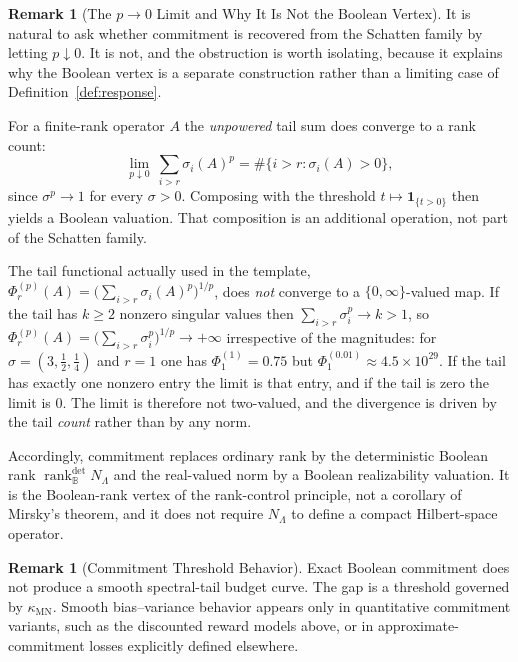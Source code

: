 \documentclass[12pt]{article}
\theoremstyle{definition}
\newtheorem{remark}[theorem]{Remark}
\newcommand{\rankBdet}{\operatorname{rank}_{\mathbb B}^{\mathrm{det}}}
\newcommand{\kappaMN}{\kappa_{\mathrm{MN}}}
\begin{document}
\begin{remark}[The $p\to0$ Limit and Why It Is Not the Boolean Vertex]
\label{rem:p-to-zero}
It is natural to ask whether commitment is recovered from the Schatten family
by letting $p\downarrow0$.  It is not, and the obstruction is worth isolating,
because it explains why the Boolean vertex is a separate construction rather
than a limiting case of Definition~\ref{def:response}.

For a finite-rank operator $A$ the \emph{unpowered} tail sum does converge to a
rank count:
\[
\lim_{p\downarrow0}\ \sum_{i>r}\sigma_i(A)^p
=
\#\{i>r:\sigma_i(A)>0\},
\]
since $\sigma^p\to1$ for every $\sigma>0$.  Composing with the threshold
$t\mapsto\mathbf 1_{\{t>0\}}$ then yields a Boolean valuation.  That
composition is an additional operation, not part of the Schatten family.

The tail functional actually used in the template,
$\Phi^{(p)}_r(A)=\bigl(\sum_{i>r}\sigma_i(A)^p\bigr)^{1/p}$, does \emph{not}
converge to a $\{0,\infty\}$-valued map.  If the tail has $k\ge2$ nonzero
singular values then $\sum_{i>r}\sigma_i^p\to k>1$, so
$\Phi^{(p)}_r(A)=\bigl(\sum_{i>r}\sigma_i^p\bigr)^{1/p}\to+\infty$ irrespective
of the magnitudes: for $\sigma=(3,\tfrac12,\tfrac14)$ and $r=1$ one has
$\Phi^{(1)}_1=0.75$ but $\Phi^{(0.01)}_1\approx4.5\times10^{29}$.  If the tail
has exactly one nonzero entry the limit is that entry, and if the tail is zero
the limit is $0$.  The limit is therefore not two-valued, and the divergence is
driven by the tail \emph{count} rather than by any norm.

Accordingly, commitment replaces ordinary rank by the deterministic Boolean
rank $\rankBdet N_\Lambda$ and the real-valued norm by a Boolean realizability
valuation.  It is the Boolean-rank vertex of the rank-control principle, not a
corollary of Mirsky's theorem, and it does not require $N_\Lambda$ to define a
compact Hilbert-space operator.
\end{remark}

\begin{remark}[Commitment Threshold Behavior]
\label{rem:commitment-degeneracy}
Exact Boolean commitment does not produce a smooth spectral-tail budget curve.
The gap is a threshold governed by $\kappaMN$.  Smooth bias--variance behavior
appears only in quantitative commitment variants, such as the discounted
reward models above, or in approximate-commitment losses explicitly defined
elsewhere.
\end{remark}
\end{document}
